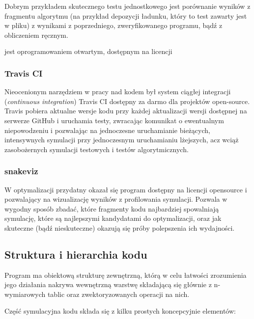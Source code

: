     Dobrym przykładem skutecznego testu jednostkowego jest porównanie wyników z
    fragmentu algorytmu (na przykład depozycji ładunku, który to test zawarty
    jest w pliku) 
     z wynikami z poprzedniego, zweryfikowanego
    programu, bądź z obliczeniem ręcznym.

     jest oprogramowaniem otwartym, dostępnym na licencji

    \subsubsection{Travis CI}
    Nieocenionym narzędziem w pracy nad kodem był system ciągłej integracji
    (\emph{continuous integration}) Travis CI  dostępny za
    darmo dla projektów open-source. Travis pobiera aktualne wersje kodu przy
    każdej aktualizacji wersji dostępnej na serwerze GitHub i uruchamia testy,
    zwracając komunikat o ewentualnym niepowodzeniu i pozwalając na jednoczesne
    uruchamianie bieżących, intensywnych symulacji przy jednoczesnym
    uruchamianiu lżejszych, acz wciąż zasobożernych 
    symulacji testowych i testów algorytmicznych.

    \subsubsection{snakeviz} W optymalizacji przydatny okazał się program
     dostępny na licencji opensource i pozwalający na
    wizualizację wyników z profilowania symulacji. Pozwala w wygodny sposób
    zbadać, które fragmenty kodu najbardziej spowalniają symulację, które są
    najlepszymi kandydatami do optymalizacji, oraz jak skuteczne (bądź
    nieskuteczne) okazują się próby polepszenia ich wydajności.
     

    \subsection{Struktura i hierarchia kodu}

    Program ma obiektową strukturę zewnętrzną, którą w celu łatwości
    zrozumienia jego działania nakrywa wewnętrzną warstwę składającą się
    głównie z n-wymiarowych tablic  oraz zwektoryzowanych
    operacji na nich.

    Część symulacyjna kodu składa się z kilku prostych koncepcyjnie elementów:

